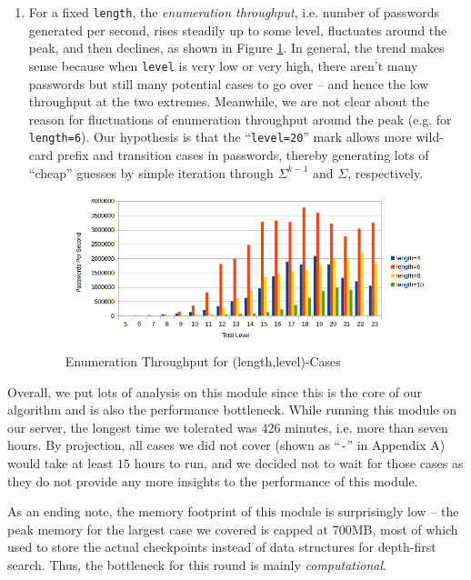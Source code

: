\documentclass{article} %
\theoremstyle{definition}
\theoremstyle{theorem}
\theoremstyle{remark}
\theoremstyle{remark}
\begin{document}
\begin{enumerate}
    \item For a fixed \texttt{length}, the \emph{enumeration throughput}, i.e. number of passwords generated per second, rises steadily up to some level, fluctuates around the peak, and then declines, as shown in Figure \ref{fig:passrate}. In general, the trend makes sense because when \texttt{level} is very low or very high, there aren't many passwords but still many potential cases to go over -- and hence the low throughput at the two extremes. Meanwhile, we are not clear about the reason for fluctuations of enumeration throughput around the peak (e.g. for \texttt{length=6}). Our hypothesis is that the ``\texttt{level=20}'' mark allows more wild-card prefix and transition cases in passwords, thereby generating lots of ``cheap'' guesses by simple iteration through $\Sigma^{k-1}$ and $\Sigma$, respectively.
    
        \begin{figure}[!htbp]
        \begin{center}
            \includegraphics[width=.85\textwidth]{diag/passwd-speed.png}
        \end{center}
        \vspace{-15pt}
        \caption{Enumeration Throughput for (length,level)-Cases}
        \vspace{-15pt}
        \label{fig:passrate}
        \end{figure}
\end{enumerate}

\par\quad Overall, we put lots of analysis on this module since this is the core of our algorithm and is also the performance bottleneck. While running this module on our server, the longest time we tolerated was 426 minutes, i.e. more than seven hours. By projection, all cases we did not cover (shown as ``\texttt{-}'' in Appendix A) would take at least $15$ hours to run, and we decided not to wait for those cases as they do not provide any more insights to the performance of this module.
\par\quad As an ending note, the memory footprint of this module is surprisingly low -- the peak memory for the largest case we covered is capped at 700MB, most of which used to store the actual checkpoints instead of data structures for depth-first search. Thus, the bottleneck for this round is mainly \emph{computational}.
\end{document}
